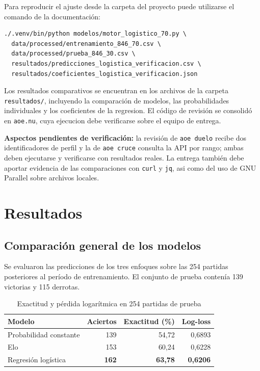 \documentclass[12pt,a4paper]{article}
\begin{document}
Para reproducir el ajuste desde la carpeta del proyecto puede utilizarse el comando de la documentación:
\begin{lstlisting}
./.venv/bin/python modelos/motor_logistico_70.py \
  data/processed/entrenamiento_846_70.csv \
  data/processed/prueba_846_30.csv \
  resultados/predicciones_logistica_verificacion.csv \
  resultados/coeficientes_logistica_verificacion.json
\end{lstlisting}

Los resultados comparativos se encuentran en los archivos de la carpeta \texttt{resultados/}, incluyendo la comparación de modelos, las probabilidades individuales y los coeficientes de la regresion. El código de revisión se consolidó en \texttt{aoe.nu}, cuya ejecucion debe verificarse sobre el equipo de entrega.

\textbf{Aspectos pendientes de verificación:} la revisión de \texttt{aoe duelo} recibe dos identificadores de perfil y la de \texttt{aoe cruce} consulta la API por rango; ambas deben ejecutarse y verificarse con resultados reales. La entrega también debe aportar evidencia de las comparaciones con \texttt{curl} y \texttt{jq}, asi como del uso de GNU Parallel sobre archivos locales.

\section{Resultados}

\subsection{Comparación general de los modelos}

Se evaluaron las predicciones de los tres enfoques sobre las 254 partidas posteriores al período de entrenamiento. El conjunto de prueba contenía 139 victorias y 115 derrotas.

\begin{table}[htbp]
\centering
\caption{Exactitud y pérdida logarítmica en 254 partidas de prueba}
\label{tab:comparacion}
\begin{tabular}{lrrr}
\toprule
\textbf{Modelo} & \textbf{Aciertos} & \textbf{Exactitud (\%)} & \textbf{Log-loss}\\
\midrule
Probabilidad constante & 139 & 54,72 & 0,6893\\
Elo & 153 & 60,24 & 0,6228\\
Regresión logística & \textbf{162} & \textbf{63,78} & \textbf{0,6206}\\
\bottomrule
\end{tabular}
\end{table}
\end{document}

